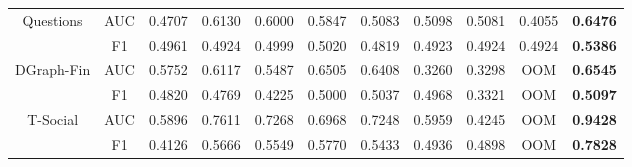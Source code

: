 \begin{table}[t]
{\begin{tabular}{cc|ccccccccc}
\multirow{2}{*}{Questions}  & AUC     & 0.4707 & 0.6130 & 0.6000 & 0.5847 & 0.5083 & 0.5098 & 0.5081 & 0.4055 & \textbf{0.6476} \\
                            & F1      & 0.4961 & 0.4924 & 0.4999 & 0.5020 & 0.4819 & 0.4923 & 0.4924 & 0.4924 & \textbf{0.5386} \\ \hline
\multirow{2}{*}{DGraph-Fin} & AUC     & 0.5752 & 0.6117 & 0.5487 & 0.6505 & 0.6408 & 0.3260 & 0.3298 & OOM    & \textbf{0.6545} \\
                            & F1      & 0.4820 & 0.4769 & 0.4225 & 0.5000 & 0.5037 & 0.4968 & 0.3321 & OOM    & \textbf{0.5097} \\ \hline
\multirow{2}{*}{T-Social}   & AUC     & 0.5896 & 0.7611 & 0.7268 & 0.6968 & 0.7248 & 0.5959 & 0.4245 & OOM    & \textbf{0.9428} \\
                            & F1      & 0.4126 & 0.5666 & 0.5549 & 0.5770 & 0.5433 & 0.4936 & 0.4898 & OOM    & \textbf{0.7828} \\ \hline \hline
\end{tabular}
}\vspace{-4mm}
\end{table}

